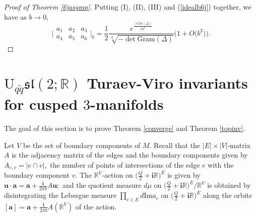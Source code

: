 \documentclass[11pt]{article}
\theoremstyle{remark}
\theoremstyle{remark}
\numberwithin{equation}{section}
\begin{document}
\begin{proof}[Proof of Theorem \ref{6jasymp}]
Putting (I), (II), (III) and (\ref{idealb6j}) together, we have as $b\to 0,$ 
$$\bigg|\begin{matrix} a_1 & a_2 & a_3 \\ a_4 & a_5 & a_6 \end{matrix} \bigg|_b =\frac{1}{2}\frac{e^{\frac{-\mathrm{Cov}(\Delta)}{\pi b^2}}}{\sqrt[4]{-\det\mathrm{Gram}(\Delta)}}\Big(1+O\big(b^2\big)\Big). $$ 
\end{proof}





\section{$\mathrm {U}_{q\tilde q}\mathfrak{sl}(2;\mathbb R)$ Turaev-Viro invariants for cusped  $3$-manifolds}


The goal of this section is to prove Theorem \ref{converge} and Theorem \ref{topinv}.


Let $V$ be the set of boundary components of $M.$ Recall that the $|E|\times |V|$-matrix $A$ is the adjacency matrix of the edges and the boundary components given by $A_{e,v}=|e\cap v|,$ the number of points of intersections of the edge $e$ with the boundary component $v.$  The $\mathbb R^V$-action on $\big(\frac{Q}{2}+\mathbf i \mathbb R\big)^E$ is given by $\boldsymbol u\cdot \boldsymbol a = \boldsymbol a + \frac{\mathbf i}{2\pi b} A \boldsymbol u;$ and the  quotient measure $d
\mu$ on $\big(\frac{Q}{2}+\mathbf i \mathbb R\big)^E/\mathbb R^V$ is obtained by disintegrating the Lebesgue measure $\prod_{e\in E} d\mathrm{Im}a_e$ on $\big(\frac{Q}{2}+\mathbf i\mathbb R\big)^ E$ along the orbits $[\boldsymbol a]= \boldsymbol a + \frac{\mathbf i}{2\pi b} A(\mathbb R^V)$ of the action. 
\end{document}
